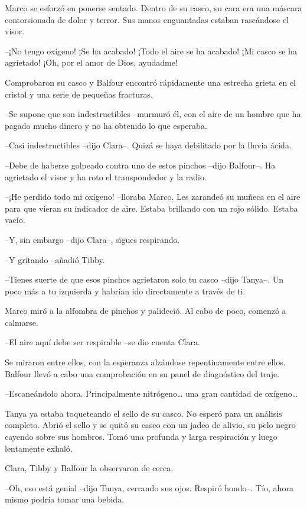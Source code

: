 {Marco se esforzó en ponerse sentado. Dentro de su casco, su cara era una
 máscara contorsionada de dolor y terror. Sus manos enguantadas estaban
rascándose el visor.}

{--¡No tengo oxígeno! ¡Se ha acabado! ¡Todo el aire se ha acabado! ¡Mi
casco se ha agrietado! ¡Oh, por el amor de Dios, ayudadme!}

{Comprobaron su casco y Balfour encontró rápidamente una estrecha grieta
en el cristal y una serie de pequeñas fracturas.}

{--Se supone que son indestructibles --murmuró él, con el aire de un
hombre que ha pagado mucho dinero y no ha obtenido lo que esperaba.}

{--Casi indestructibles --dijo Clara--. Quizá se haya debilitado por la
lluvia ácida.}

{--Debe de haberse golpeado contra uno de estos pinchos --dijo Balfour--.
Ha agrietado el visor y ha roto el transpondedor y la radio.}

{--¡He perdido todo mi oxígeno! --lloraba Marco. Les zarandeó su muñeca
 en el aire para que vieran su indicador de aire. Estaba brillando con un
rojo sólido. Estaba vacío.}

{--Y, sin embargo --dijo Clara--, sigues respirando.}

{--Y gritando --añadió Tibby.}

{--Tienes suerte de que esos pinchos agrietaron solo tu casco --dijo
 Tanya--. Un poco más a tu izquierda y habrían ido directamente a través
de ti.}

{Marco miró a la alfombra de pinchos y palideció. Al cabo de poco,
comenzó a calmarse.}

{--El aire aquí debe ser respirable --se dio cuenta Clara.}

{Se miraron entre ellos, con la esperanza alzándose repentinamente entre
 ellos. Balfour llevó a cabo una comprobación en su panel de diagnóstico
del traje.}

{--Escaneándolo ahora. Principalmente nitrógeno\ldots{} una gran cantidad
 de oxígeno\ldots{}}

{Tanya ya estaba toqueteando el sello de su casco. No esperó para un
 análisis completo. Abrió el sello y se quitó su casco con un jadeo de
 alivio, su pelo negro cayendo sobre sus hombros. Tomó una profunda y
larga respiración y luego lentamente exhaló.}

{Clara, Tibby y Balfour la observaron de cerca.}

{--Oh, eso está genial --dijo Tanya, cerrando sus ojos. Respiró hondo--.
Tío, ahora mismo podría tomar una bebida.}

